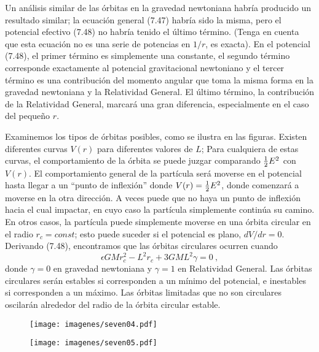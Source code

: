 \documentclass[11pt,b5paper,openany,twoside]{book}
\begin{document}
Un análisis similar de las órbitas en la gravedad newtoniana habría producido un resultado similar; la ecuación general (7.47) habría sido la misma, pero el potencial efectivo (7.48) no habría tenido el último término.
(Tenga en cuenta que esta ecuación no es una serie de potencias en $1/r$, es exacta).
En el potencial (7.48), el primer término es simplemente una constante, el segundo término corresponde exactamente al potencial gravitacional newtoniano y el tercer término es una contribución del momento angular que toma la misma forma en la gravedad newtoniana y la Relatividad General.
El último término, la contribución de la Relatividad General, marcará una gran diferencia, especialmente en el caso del pequeño $r$.

Examinemos los tipos de órbitas posibles, como se ilustra en las figuras.
Existen diferentes curvas $V(r)$ para diferentes valores de $L$; Para cualquiera de estas curvas, el comportamiento de la órbita se puede juzgar comparando ${1\over 2}E^2$ con $V(r)$.
El comportamiento general de la partícula será moverse en el potencial hasta llegar a un ``punto de inflexión'' donde $V(r)={1\over 2}E^2$, donde comenzará a moverse en la otra dirección.
A veces puede que no haya un punto de inflexión hacia el cual impactar, en cuyo caso la partícula simplemente continúa su camino.
En otros casos, la partícula puede simplemente moverse en una órbita circular en el radio $r_c= const$; esto puede suceder si el potencial es plano, $dV/dr=0$.
Derivando (7.48), encontramos que las órbitas circulares ocurren cuando
\begin{equation}
\epsilon GM r_c^2 - L^2 r_c +3GML^2\gamma =0\ ,\label{7.49}
\end{equation}
donde $\gamma=0$ en gravedad newtoniana y $\gamma=1$ en Relatividad General.
Las órbitas circulares serán estables si corresponden a un mínimo del potencial, e inestables si corresponden a un máximo.
Las órbitas limitadas que no son circulares oscilarán alrededor del radio de la órbita circular estable.

\begin{figure}[h]
\centering
\texttt{[image: imagenes/seven04.pdf]}
\end{figure}

\begin{figure}[h]
\centering
\texttt{[image: imagenes/seven05.pdf]}
\end{figure}
\end{document}
